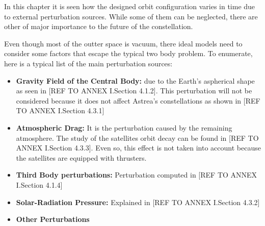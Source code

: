\label{TypesPerturb}

In this chapter it is seen how the designed orbit configuration varies in time due to external perturbation sources. While some of them can be neglected, there are other of major importance to the future of the constellation.

Even though most of the outter space is vacuum, there ideal models need to consider some factors that escape the typical two body problem. To enumerate, here is a typical list of the main perturbation sources:
\begin{itemize}
\item \textbf{Gravity Field of the Central Body:} due to the Earth's aspherical shape as seen in [REF TO ANNEX I.Section 4.1.2]. This perturbation will not be considered because it does not affect Astrea's constellations as shown in [REF TO ANNEX I.Section 4.3.1]
\item \textbf{Atmospheric Drag:} It is the perturbation caused by the remaining atmosphere. The study of the satellites orbit decay can be found in [REF TO ANNEX I.Section 4.3.3]. Even so, this effect is not taken into account because the satellites are equipped with thrusters.
\item \textbf{Third Body perturbations:} Perturbation computed in [REF TO ANNEX I.Section 4.1.4]
\item \textbf{Solar-Radiation Pressure:} Explained in [REF TO ANNEX I.Section 4.3.2]
\item \textbf{Other Perturbations}
\end{itemize}
